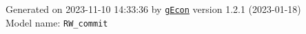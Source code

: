 \documentclass[10pt,a4paper]{article}
\numberwithin{equation}{section}
\begin{document}
\begin{landscape}
\begin{flushleft}{\large
Generated  on 2023-11-10 14:33:36 by \href{http://gecon.r-forge.r-project.org/}{\texttt{gEcon}} version 1.2.1 (2023-01-18)\\
Model name: \verb+RW_commit+
}\end{flushleft}


\end{landscape}

\end{document}
